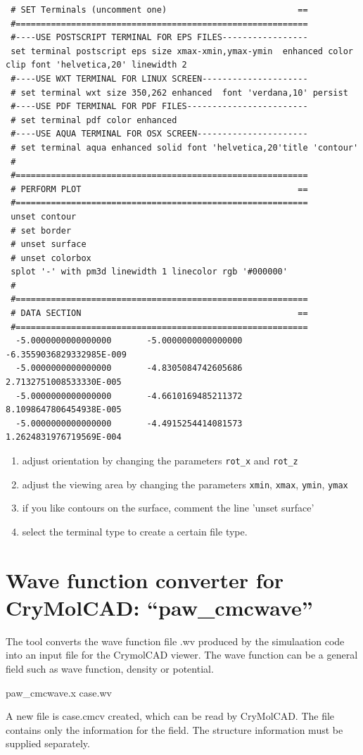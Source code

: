 \documentclass[final,12pt,makeidx,DIV=calc]{article}
\begin{document}
{{{{{{{\begin{verbatim}
 # SET Terminals (uncomment one)                          ==
 #==========================================================
 #----USE POSTSCRIPT TERMINAL FOR EPS FILES-----------------
 set terminal postscript eps size xmax-xmin,ymax-ymin  enhanced color clip font 'helvetica,20' linewidth 2 
 #----USE WXT TERMINAL FOR LINUX SCREEN---------------------
 # set terminal wxt size 350,262 enhanced  font 'verdana,10' persist 
 #----USE PDF TERMINAL FOR PDF FILES------------------------
 # set terminal pdf color enhanced 
 #----USE AQUA TERMINAL FOR OSX SCREEN----------------------
 # set terminal aqua enhanced solid font 'helvetica,20'title 'contour'
 #
 #==========================================================
 # PERFORM PLOT                                           ==
 #==========================================================
 unset contour
 # set border
 # unset surface
 # unset colorbox
 splot '-' with pm3d linewidth 1 linecolor rgb '#000000'
 #
 #==========================================================
 # DATA SECTION                                           ==
 #==========================================================
  -5.0000000000000000       -5.0000000000000000       -6.3559036829332985E-009
  -5.0000000000000000       -4.8305084742605686        2.7132751008533330E-005
  -5.0000000000000000       -4.6610169485211372        8.1098647806454938E-005
  -5.0000000000000000       -4.4915254414081573        1.2624831976719569E-004
\end{verbatim}}

\begin{enumerate}
\item adjust orientation by changing the parameters \verb|rot_x| and
  \verb|rot_z|
\item adjust the viewing area by changing the parameters \verb|xmin|,
  \verb|xmax|, \verb|ymin|, \verb|ymax|
\item if you like contours on the surface, comment the line 'unset surface'
\item select the terminal type to create a certain file type.
\end{enumerate}



\newpage
\section{Wave function converter for CryMolCAD: ``paw\_cmcwave''}
The tool converts the wave function file .wv produced by the
simulaation code into an input file for the CrymolCAD viewer. The wave
function can be a general field such as wave function, density or
potential.
\begin{center}
paw\_cmcwave.x case.wv
\end{center}
A new file is case.cmcv created, which can be read by CryMolCAD. The
file contains only the information for the field. The structure
information must be supplied separately.


}}}}}}
\end{document}
